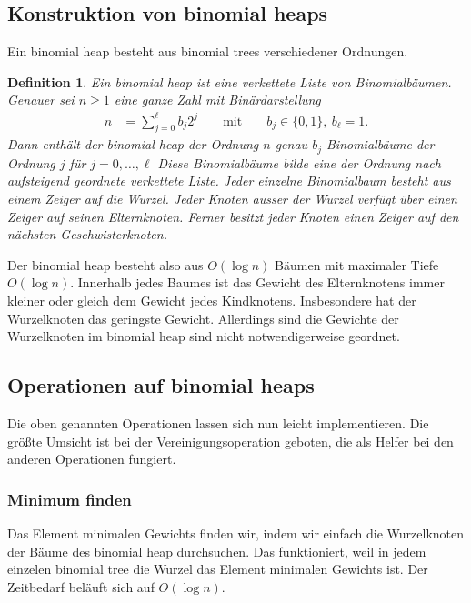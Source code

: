 \documentclass[10pt,reqno]{amsart}
\numberwithin{equation}{section}
\newtheorem{definition}{Definition}[section]
\begin{document}
\subsection{Konstruktion von binomial heaps}\label{sec_binomial_heaps}

Ein binomial heap besteht aus binomial trees verschiedener Ordnungen.

\begin{definition}\label{def_binomial_heap}
	Ein binomial heap ist eine verkettete Liste von Binomialb\"aumen.
	Genauer sei $n\ge1$ eine ganze Zahl mit Bin\"ardarstellung 
	\begin{align*}
		n&=\sum_{j=0}^\ell b_j2^j&&\mbox{ mit }&&b_j\in\{0,1\},\ b_\ell=1.
	\end{align*}
	Dann enth\"alt der binomial heap der Ordnung $n$ genau $b_j$ Binomialb\"aume der Ordnung $j$ f\"ur $j=0,\ldots,\ell$
	Diese Binomialb\"aume bilde eine der Ordnung nach aufsteigend geordnete verkettete Liste.
	Jeder einzelne Binomialbaum besteht aus einem Zeiger auf die Wurzel.
	Jeder Knoten ausser der Wurzel verf\"ugt \"uber einen Zeiger auf seinen Elternknoten.
	Ferner besitzt jeder Knoten einen Zeiger auf den n\"achsten Geschwisterknoten.
\end{definition}

Der binomial heap besteht also aus $O(\log n)$ B\"aumen mit maximaler Tiefe $O(\log n)$.
Innerhalb jedes Baumes ist das Gewicht des Elternknotens immer kleiner oder gleich dem Gewicht jedes Kindknotens.
Insbesondere hat der Wurzelknoten das geringste Gewicht.
Allerdings sind die Gewichte der Wurzelknoten im binomial heap sind nicht notwendigerweise geordnet.

\subsection{Operationen auf binomial heaps}\label{sec_binomial_heaps_ops}
Die oben genannten Operationen lassen sich nun leicht implementieren.
Die gr\"o\ss te Umsicht ist bei der Vereinigungsoperation geboten, die als Helfer bei den anderen Operationen fungiert.

\subsubsection{Minimum finden}
Das Element minimalen Gewichts finden wir, indem wir einfach die Wurzelknoten der B\"aume des binomial heap durchsuchen.
Das funktioniert, weil in jedem einzelen binomial tree die Wurzel das Element minimalen Gewichts ist.
Der Zeitbedarf bel\"auft sich auf $O(\log n)$.
\end{document}
